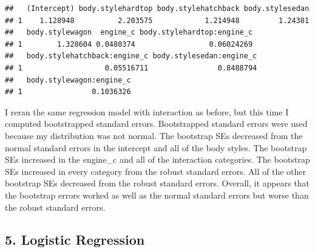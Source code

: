 \documentclass[]{article}
\newenvironment{Shaded}{\begin{snugshade}}{\end{snugshade}}
\newcommand{\KeywordTok}[1]{\textcolor[rgb]{0.13,0.29,0.53}{\textbf{#1}}}
\newcommand{\DataTypeTok}[1]{\textcolor[rgb]{0.13,0.29,0.53}{#1}}
\newcommand{\DecValTok}[1]{\textcolor[rgb]{0.00,0.00,0.81}{#1}}
\newcommand{\StringTok}[1]{\textcolor[rgb]{0.31,0.60,0.02}{#1}}
\newcommand{\OtherTok}[1]{\textcolor[rgb]{0.56,0.35,0.01}{#1}}
\newcommand{\OperatorTok}[1]{\textcolor[rgb]{0.81,0.36,0.00}{\textbf{#1}}}
\newcommand{\NormalTok}[1]{#1}
\begin{document}
\begin{Shaded}
\end{Shaded}

\begin{verbatim}
##   (Intercept) body.stylehardtop body.stylehatchback body.stylesedan
## 1    1.128948          2.203575            1.214948         1.24381
##   body.stylewagon  engine_c body.stylehardtop:engine_c
## 1        1.328604 0.0480374                 0.06024269
##   body.stylehatchback:engine_c body.stylesedan:engine_c
## 1                   0.05516711                0.8488794
##   body.stylewagon:engine_c
## 1                0.1036326
\end{verbatim}

I reran the same regression model with interaction as before, but this
time I computed bootstrapped standard errors. Bootstrapped standard
errors were used because my distribution was not normal. The bootstrap
SEs decreased from the normal standard errors in the intercept and all
of the body styles. The bootstrap SEs increased in the engine\_c and all
of the interaction categories. The bootstrap SEs increased in every
category from the robust standard errors. All of the other bootstrap SEs
decreased from the robust standard errors. Overall, it appears that the
bootstrap errors worked as well as the normal standard errors but worse
than the robust standard errors.

\subsection{5. Logistic Regression}\label{logistic-regression}
\end{document}

